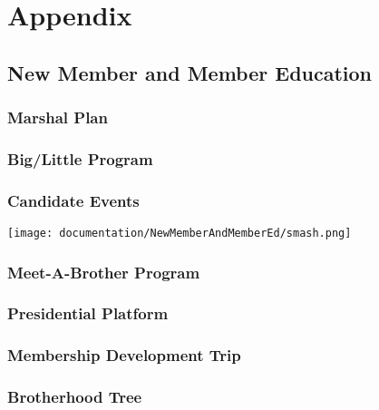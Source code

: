 \chapter{Appendix}

  \section{New Member and Member Education} 
    \subsection{Marshal Plan}
      
    \subsection{Big/Little Program}
      
      
    \subsection{Candidate Events}
      
      
      
      
      \texttt{[image: documentation/NewMemberAndMemberEd/smash.png]}
    \subsection{Meet-A-Brother Program}
      
    \subsection{Presidential Platform}
      
    \subsection{Membership Development Trip}
      
    \subsection{Brotherhood Tree}
      
      

